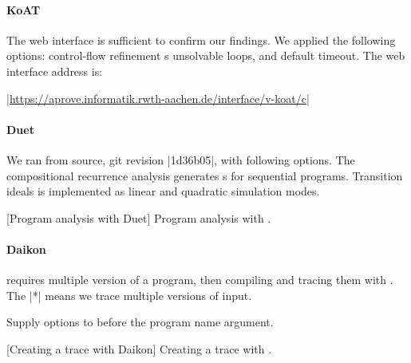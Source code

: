 \paragraph*{KoAT}
The  web interface is sufficient to confirm our findings.
We applied the following options:
\myok{ }control-flow refinement
\myok{ }s
\myok{ }unsolvable loops, and default timeout.
The web interface address is:

\begin{center}
\href{https://aprove.informatik.rwth-aachen.de/interface/v-koat/c}%
{\pr|https://aprove.informatik.rwth-aachen.de/interface/v-koat/c|}
\end{center}

\paragraph*{Duet}
We ran  from source, git revision \pr|1d36b05|, with following
options. The compositional recurrence analysis generates s for
sequential programs. Transition ideals is implemented as
linear and quadratic simulation modes.
\begin{center}
\begin{minipage}{\textwidth}
\captionsetup{type=lstlisting}
[Program analysis with Duet]
{Program analysis with .}
\label{lst:duet-bash}
\end{minipage}
\end{center}

\paragraph*{Daikon}
 requires multiple version of a program, then compiling and tracing
them with . The \pr|*| means we trace multiple
versions of input. \newline

Supply options to  before the program name argument.

\begin{center}
\begin{minipage}{\textwidth}
\captionsetup{type=lstlisting}
[Creating a trace with Daikon]
{Creating a trace with .}
\label{lst:kvasir-bash}
\end{minipage}
\end{center}

